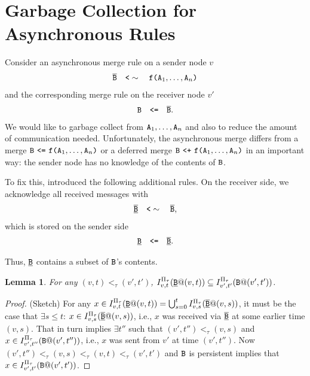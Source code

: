 \documentclass{article}
\numberwithin{equation}{section}
\newtheorem{lemma}[theorem]{Lemma}
\renewcommand{\tt}[1]{\ifmmode\text{\texttt{#1}}\else\texttt{#1}\fi}
\begin{document}
\section{Garbage Collection for Asynchronous Rules}
\label{sec:async_gc}
Consider an asynchronous merge rule on a sender node $v$
\begin{align*}
\overline{\tt{B}} \quad\tt{<}\sim\quad \tt{f}\tt{(}\tt{A}_1,\dots,\tt{A}_n\tt{)}
\end{align*}
and the corresponding merge rule on the receiver node $v'$
\begin{align*}
\tt{B} \quad\tt{<=}\quad \overline{\tt{B}}.
\end{align*}
We would like to garbage collect from $\tt{A}_1, \dots, \tt{A}_n$ and also to reduce the amount of communication needed.
Unfortunately, the asynchronous merge differs from a merge $\tt{B} ~\tt{<=}~ \tt{f}\tt{(}\tt{A}_1,\dots,\tt{A}_n\tt{)}$ or a deferred merge $\tt{B} ~\tt{<+}~ \tt{f}\tt{(}\tt{A}_1,\dots,\tt{A}_n\tt{)}$ in an important way:
the sender node has no knowledge of the contents of $\tt{B}$.

To fix this, \cite{conway2014edelweiss} introduced the following additional rules.
On the receiver side, we acknowledge all received messages with
\begin{align*}
\overline{\underline{\tt{B}}} \quad\tt{<}\sim\quad \overline{\tt{B}},
\end{align*}
which is stored on the sender side
\begin{align*}
\underline{\tt{B}} \quad\tt{<=}\quad \overline{\underline{\tt{B}}}.
\end{align*}

Thus, $\underline{\tt{B}}$ contains a subset of $\tt{B}$'s contents.
\begin{lemma}
\label{lem:async_merge_contains}
For any $(v,t) <_\tau (v',t')$, $I^{\Pi_\tau}_{v,t}(\underline{\tt{B}}@(v,t)) \subseteq I^{\Pi_\tau}_{v',t'}(\tt{B}@(v',t'))$.
\end{lemma}
\begin{proof}(Sketch)
For any $x \in I^{\Pi_\tau}_{v,t}(\underline{\tt{B}}@(v,t)) = \bigcup_{s=0}^t I^{\Pi_\tau}_{v,s}(\overline{\underline{\tt{B}}}@(v,s))$, it must be the case that $\exists s \leq t$: $x \in I^{\Pi_\tau}_{v,s}(\overline{\underline{\tt{B}}}@(v,s))$, i.e., $x$ was received via $\overline{\underline{\tt{B}}}$ at some earlier time $(v,s)$.
That in turn implies
$\exists t''$ such that $(v',t'') <_\tau (v,s)$ and $x \in I^{\Pi_\tau}_{v',t''}(\tt{B}@(v',t''))$, i.e., $x$ was sent from $v'$ at time $(v',t'')$.
Now $(v',t'') <_\tau (v,s) <_\tau (v,t) <_\tau (v',t')$ and $\tt{B}$ is persistent implies that $x \in I^{\Pi_\tau}_{v',t'}(\tt{B}@(v',t'))$.
\end{proof}
\end{document}
